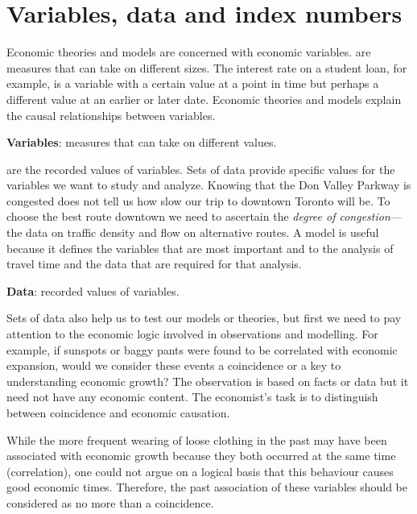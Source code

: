 \section{Variables, data and index numbers}\label{sec:ch2sec2}

Economic theories and models are concerned with economic variables.  are measures that can take on different sizes. The interest rate on a student loan, for example, is a variable with a certain value at a point in time but perhaps a different value at an earlier or later date. Economic theories and models explain the causal relationships between variables.

\begin{DefBox}
\textbf{Variables}: measures that can take on different values.
\end{DefBox}

 are the recorded values of variables. Sets of data provide specific values for the variables we want to study and analyze. Knowing that the Don Valley Parkway is congested does not tell us how slow our trip to downtown Toronto will be. To choose the best route downtown we need to ascertain the \textit{degree of congestion}---the data on traffic density and flow on alternative routes. A model is useful because it defines the variables that are most important and to the analysis of travel time and the data that are required for that analysis.

\begin{DefBox}
\textbf{Data}: recorded values of variables.
\end{DefBox}

Sets of data also help us to test our models or theories, but first we need to pay attention to the economic logic involved in observations and modelling. For example, if sunspots or baggy pants were found to be correlated with economic expansion, would we consider these events a coincidence or a key to understanding economic growth? The observation is based on facts or data but it need not have any economic content. The economist's task is to distinguish between coincidence and economic causation. 

While the more frequent wearing of loose clothing in the past may have been associated with economic growth because they both occurred at the same time (correlation), one could not argue on a logical basis that this behaviour causes good economic times. Therefore, the past association of these variables should be considered as no more than a coincidence.

